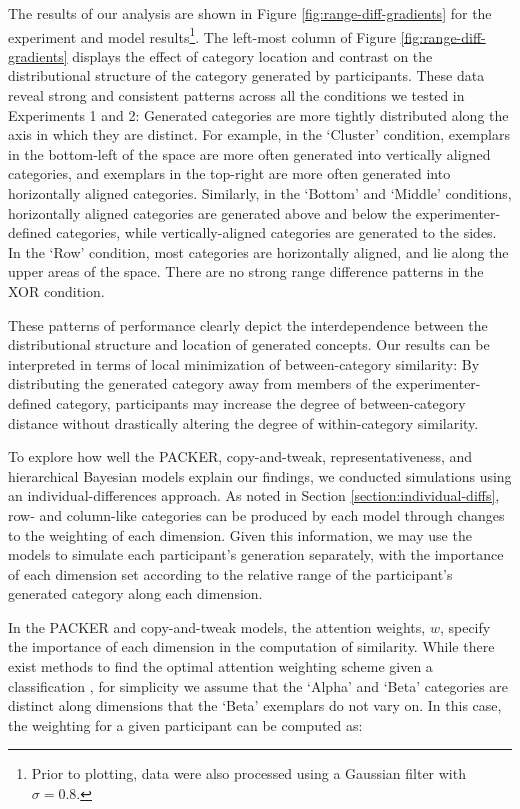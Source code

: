 \documentclass[12pt]{article}
\begin{document}
\begin{flushleft}
The results of our analysis are shown in Figure \ref{fig:range-diff-gradients}
for the experiment and model results\footnote{Prior to plotting, data were also
processed using a Gaussian filter with $\sigma = 0.8$.}. The left-most column of
Figure \ref{fig:range-diff-gradients} displays the effect of category location
and contrast on the distributional structure of the category generated by
participants. These data reveal strong and consistent patterns across all the
conditions we tested in Experiments 1 and 2: Generated categories are more
tightly distributed along the axis in which they are distinct. For example, in
the `Cluster' condition, exemplars in the bottom-left of the space are more
often generated into vertically aligned categories, and exemplars in the
top-right are more often generated into horizontally aligned categories.
Similarly, in the `Bottom' and `Middle' conditions, horizontally aligned
categories are generated above and below the experimenter-defined categories,
while vertically-aligned categories are generated to the sides. In the `Row'
condition, most categories are horizontally aligned, and lie along the upper
areas of the space. There are no strong range difference patterns in the XOR
condition.

These patterns of performance clearly depict the interdependence between the
distributional structure and location of generated concepts. Our results can be
interpreted in terms of local minimization of between-category similarity: By
distributing the generated category away from members of the
experimenter-defined category, participants may increase the degree of
between-category distance without drastically altering the degree of
within-category similarity.

To explore how well the PACKER, copy-and-tweak, representativeness, and
hierarchical Bayesian models explain our findings, we conducted simulations
using an individual-differences approach. As noted in Section
\ref{section:individual-diffs}, row- and column-like categories can be produced
by each model through changes to the weighting of each dimension. Given this
information, we may use the models to simulate each participant's generation
separately, with the importance of each dimension set according to the relative
range of the participant's generated category along each dimension.

In the PACKER and copy-and-tweak models, the attention weights, $w$, specify the
importance of each dimension in the computation of similarity. While there exist
methods to find the optimal attention weighting scheme given a classification
\citep[see][]{vanpaemel2012using}, for simplicity we assume that the `Alpha' and
`Beta' categories are distinct along dimensions that the `Beta' exemplars do
not vary on. In this case, the weighting for a given participant can be computed
as:


\end{flushleft}
\end{document}
